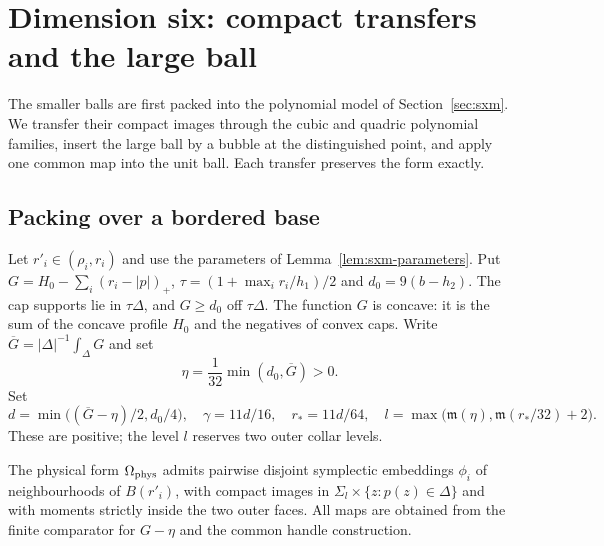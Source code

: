 \section{Dimension six: compact transfers and the large ball}\label{sec:sxr}

The smaller balls are first packed into the polynomial model of Section~\ref{sec:sxm}.
We transfer their compact images through the cubic and quadric polynomial families,
insert the large ball by a bubble at the distinguished point, and apply one common
map into the unit ball. Each transfer preserves the form exactly.

\subsection{Packing over a bordered base}\label{sec:sxr-minorant}

Let $r'_i\in(\rho_i,r_i)$ and use the parameters of Lemma~\ref{lem:sxm-parameters}.
Put $G=H_0-\sum_i(r_i-|p|)_+$,
$\tau=(1+\max_i r_i/h_1)/2$ and $d_0=9(b-h_2)$.
The cap supports lie in $\tau\Delta$, and $G\ge d_0$ off $\tau\Delta$.
The function $G$ is concave: it is the sum of the concave profile $H_0$ and the
negatives of convex caps. Write $\overline G=|\Delta|^{-1}\int_\Delta G$ and set
\[
 \eta=\frac1{32}\min(d_0,\overline G)>0.
\]
Set
\[
 d=\min\bigl((\overline G-\eta)/2,d_0/4\bigr),\quad
 \gamma=11d/16,\quad r_*=11d/64,\quad
 l=\max\bigl(\mathfrak m(\eta),\mathfrak m(r_*/32)+2\bigr).
\]
These are positive; the level $l$ reserves two outer collar levels.

\begin{proposition}\label{prop:sxr-minorant}
The physical form $\Omega_{\rm phys}$ admits pairwise disjoint symplectic embeddings
$\phi_i$ of neighbourhoods of $B(r'_i)$, with compact images in
$\Sigma_l\times\{z:p(z)\in\Delta\}$ and with moments strictly inside the two outer
faces. All maps are obtained from the finite comparator for $G-\eta$ and the common
handle construction.
\end{proposition}

